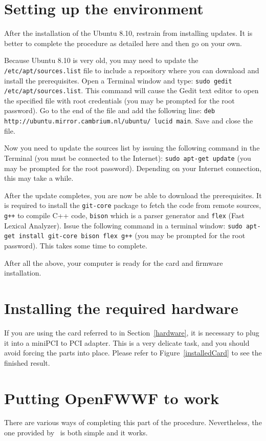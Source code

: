 \documentclass[conference]{IEEEtran}
\begin{document}
\section{Setting up the environment}
After the installation of the Ubuntu 8.10, restrain from installing updates. It is better to complete the procedure as detailed here and then go on your own.

Because Ubuntu 8.10 is very old, you may need to update the \texttt{/etc/apt/sources.list} file to include a repository where you can download and install the prerequisites. Open a Terminal window and type: \texttt{sudo gedit /etc/apt/sources.list}. This command will cause the Gedit text editor to open the specified file with root credentials (you may be prompted for the root password). Go to the end of the file and add the following line: \texttt{deb http://ubuntu.mirror.cambrium.nl/ubuntu/ lucid main}. Save and close the file.

Now you need to update the sources list by issuing the following command in the Terminal (you must be connected to the Internet): \texttt{sudo apt-get update} (you may be prompted for the root password). Depending on your Internet connection, this may take a while.

After the update completes, you are now be able to download the prerequisites. It is required to install the \texttt{git-core} package to fetch the code from remote sources, \texttt{g++} to compile C++ code, \texttt{bison} which is a parser generator and \texttt{flex} (Fast Lexical Analyzer). Issue the following command in a terminal window: \texttt{sudo apt-get install git-core bison flex g++} (you may be prompted for the root password). This takes some time to complete.

After all the above, your computer is ready for the card and firmware installation.

\section{Installing the required hardware}

If you are using the card referred to in Section~\ref{hardware}, it is necessary to plug it into a miniPCI to PCI adapter. This is a very delicate task, and you should avoid forcing the parts into place. Please refer to Figure~\ref{installedCard} to see the finished result.

\section{Putting OpenFWWF to work}
There are various ways of completing this part of the procedure. Nevertheless, the one provided by~\cite{gnewsense} is both simple and it works.
\end{document}
